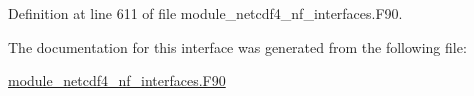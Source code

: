 Definition at line 611 of file module\+\_\+netcdf4\+\_\+nf\+\_\+interfaces.\+F90.



The documentation for this interface was generated from the following file\+:\begin{DoxyCompactItemize}
\item 
\hyperlink{module__netcdf4__nf__interfaces_8F90}{module\+\_\+netcdf4\+\_\+nf\+\_\+interfaces.\+F90}\end{DoxyCompactItemize}
